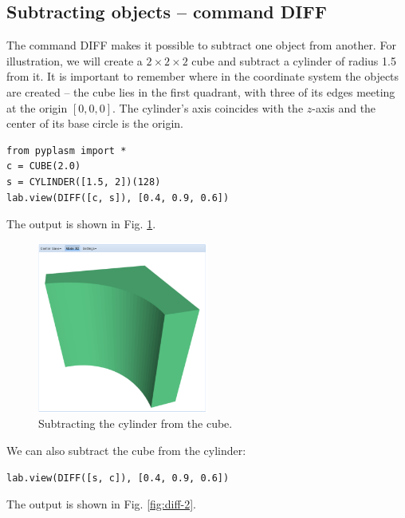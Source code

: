 \documentclass[article,A4,12pt]{llncs}
\begin{document}
\subsection{Subtracting objects -- command DIFF}

The command DIFF makes it possible to subtract one object from another.
For illustration, we will create a $2 \times 2 \times 2$ cube and subtract 
a cylinder of radius 1.5 from it. It is important to remember where in the 
coordinate system the objects are created -- the cube lies in the 
first quadrant, with three of its edges meeting at the origin $[0, 0, 0]$.
The cylinder's axis coincides with the $z$-axis and the center of its base
circle is the origin. 

\begin{verbatim}
from pyplasm import *
c = CUBE(2.0)
s = CYLINDER([1.5, 2])(128)
lab.view(DIFF([c, s]), [0.4, 0.9, 0.6]) 
\end{verbatim}
The output is shown in Fig. \ref{fig:diff-1}.

\begin{figure}[!ht]
\begin{center}
\includegraphics[width=0.5\textwidth]{img/diff-1.png}
\end{center}
\vspace{-2mm}
\caption{Subtracting the cylinder from the cube.}
\label{fig:diff-1}
\end{figure}
\noindent
We can also subtract the cube from the cylinder:

\begin{verbatim}
lab.view(DIFF([s, c]), [0.4, 0.9, 0.6]) 
\end{verbatim}
The output is shown in Fig. \ref{fig:diff-2}.

\newpage
\end{document}
